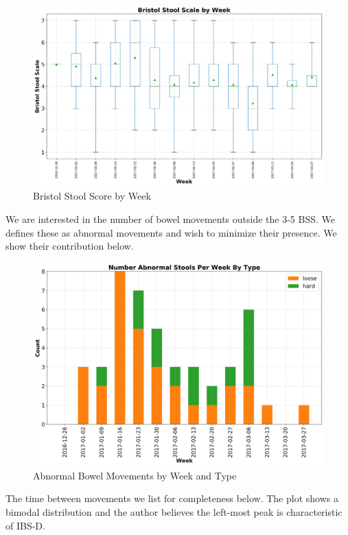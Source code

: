 \documentclass[conference]{IEEEtran}
\begin{document}
\begin{figure}[t]
    \centering
    \includegraphics[width=\columnwidth]{bss_box_whisker.png}
    \caption{Bristol Stool Score by Week}\label{fig:bss_box_whisker}
\end{figure}

We are interested in the number of bowel movements outside the 3-5 BSS. We defines these as abnormal movements and wish to minimize their presence.  We show their contribution below.

\begin{figure}[t]
    \centering
    \includegraphics[width=\columnwidth]{abnormal.png}
    \caption{Abnormal Bowel Movements by Week and Type}\label{fig:bss_abnormal}
\end{figure}

The time between movements we list for completeness below.  The plot shows a bimodal distribution and the author believes the left-most peak is characteristic of IBS-D.
\end{document}
